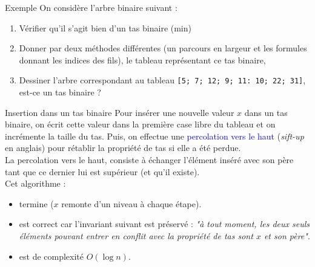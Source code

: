\documentclass[10pt]{beamer}
\begin{document}
\begin{frame}[fragile]{\Ctitle}{\stitle}
	\begin{exampleblock}{Exemple}
		On considère l'arbre binaire suivant :
		\begin{center}
			{
			}
		\end{center}
		\begin{enumerate}
			\item<1-> Vérifier qu'il s'agit bien d'un tas binaire (min)
			\item<2-> Donner par deux méthodes différentes (un parcours en largeur et les formules donnant les indices des fils), le tableau représentant ce tas binaire,
			\item<3-> Dessiner l'arbre correspondant au tableau  {\tt [5; 7; 12; 9; 11: 10; 22; 31]}, est-ce un tas binaire ?
		\end{enumerate}
	\end{exampleblock}
\end{frame}


\begin{frame}[fragile]{\Ctitle}{\stitle}
	\begin{block}{Insertion dans un tas binaire}
		Pour insérer une nouvelle valeur $x$ dans un tas binaire, on écrit cette valeur dans la première case libre du tableau et on incrémente la taille du tas. Puis, on effectue une \textcolor{blue}{percolation vers le haut} (\textit{sift-up} en anglais) pour rétablir la propriété de tas si elle a été perdue. \\
		\onslide<2->La percolation vers le haut, consiste à échanger l'élément inséré avec son père tant que ce dernier lui est supérieur (et qu'il existe). \\
		\onslide<3->Cet algorithme  :
		\begin{itemize}
			\item<4-> termine ($x$ remonte d'un niveau à chaque étape).
			\item<5-> est correct car l'invariant suivant est préservé : \textit{"à tout moment, les deux seuls éléments pouvant entrer en conflit avec la propriété de tas sont $x$ et son père"}.
			\item<6-> est de complexité $O(\log n)$.
		\end{itemize}
	\end{block}
\end{frame}
\end{document}
